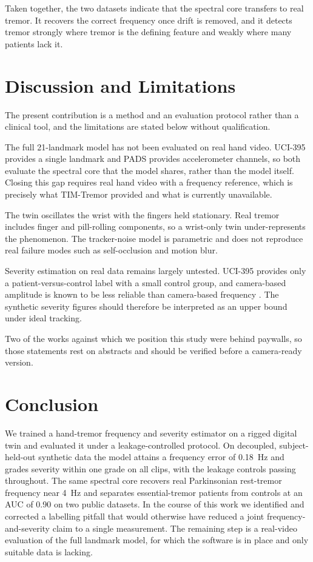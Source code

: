 \documentclass[conference]{IEEEtran}
\begin{document}
Taken together, the two datasets indicate that the spectral core transfers to real
tremor. It recovers the correct frequency once drift is removed, and it detects
tremor strongly where tremor is the defining feature and weakly where many patients
lack it.

\section{Discussion and Limitations}
The present contribution is a method and an evaluation protocol rather than a
clinical tool, and the limitations are stated below without qualification.

The full 21-landmark model has not been evaluated on real hand video. UCI-395
provides a single landmark and PADS provides accelerometer channels, so both
evaluate the spectral core that the model shares, rather than the model itself.
Closing this gap requires real hand video with a frequency reference, which is
precisely what TIM-Tremor provided and what is currently unavailable.

The twin oscillates the wrist with the fingers held stationary. Real tremor
includes finger and pill-rolling components, so a wrist-only twin under-represents
the phenomenon. The tracker-noise model is parametric and does not reproduce real
failure modes such as self-occlusion and motion blur.

Severity estimation on real data remains largely untested. UCI-395 provides only a
patient-versus-control label with a small control group, and camera-based amplitude
is known to be less reliable than camera-based frequency \cite{wolke2025}. The
synthetic severity figures should therefore be interpreted as an upper bound under
ideal tracking.

Two of the works against which we position this study were behind paywalls, so
those statements rest on abstracts and should be verified before a camera-ready
version.

\section{Conclusion}
We trained a hand-tremor frequency and severity estimator on a rigged digital twin
and evaluated it under a leakage-controlled protocol. On decoupled,
subject-held-out synthetic data the model attains a frequency error of 0.18~Hz and
grades severity within one grade on all clips, with the leakage controls passing
throughout. The same spectral core recovers real Parkinsonian rest-tremor frequency
near 4~Hz and separates essential-tremor patients from controls at an AUC of 0.90
on two public datasets. In the course of this work we identified and corrected a
labelling pitfall that would otherwise have reduced a joint frequency-and-severity
claim to a single measurement. The remaining step is a real-video evaluation of the
full landmark model, for which the software is in place and only suitable data is
lacking.
\end{document}
